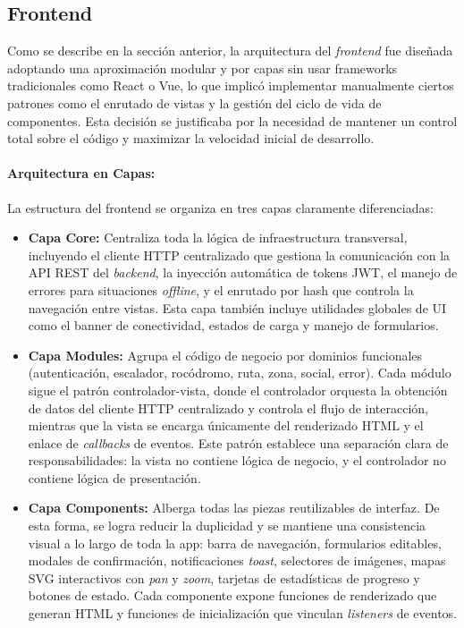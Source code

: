 \subsection{Frontend}

Como se describe en la sección anterior, la arquitectura del \textit{frontend} fue diseñada adoptando una aproximación modular 
y por capas sin usar frameworks tradicionales como React o Vue, lo que implicó implementar manualmente ciertos patrones 
como el enrutado de vistas y la gestión del ciclo de vida de componentes. Esta decisión se justificaba por la necesidad 
de mantener un control total sobre el código y maximizar la velocidad inicial de desarrollo.

\paragraph{Arquitectura en Capas:} La estructura del frontend se organiza en tres capas claramente diferenciadas:

\begin{itemize}
    \item \textbf{Capa Core:} Centraliza toda la lógica de infraestructura transversal, incluyendo el cliente HTTP centralizado que gestiona la comunicación con la API REST del \textit{backend}, la inyección automática de tokens JWT, el manejo de errores para situaciones \textit{offline}, y el enrutado por hash que controla la navegación entre vistas. Esta capa también incluye utilidades globales de UI como el banner de conectividad, estados de carga y manejo de formularios.
    
    \item \textbf{Capa Modules:} Agrupa el código de negocio por dominios funcionales (autenticación, escalador, rocódromo, ruta, zona, social, error). Cada módulo sigue el patrón controlador-vista, donde el controlador orquesta la obtención de datos del cliente HTTP centralizado y controla el flujo de interacción, mientras que la vista se encarga únicamente del renderizado HTML y el enlace de \textit{callbacks} de eventos. Este patrón establece una separación clara de responsabilidades: la vista no contiene lógica de negocio, y el controlador no contiene lógica de presentación.
    
    \item \textbf{Capa Components:} Alberga todas las piezas reutilizables de interfaz. De esta forma, se logra reducir la duplicidad y se mantiene una consistencia visual a lo largo de toda la app: barra de navegación, formularios editables, modales de confirmación, notificaciones \textit{toast}, selectores de imágenes, mapas SVG interactivos con \textit{pan} y \textit{zoom}, tarjetas de estadísticas de progreso y botones de estado. Cada componente expone funciones de renderizado que generan HTML y funciones de inicialización que vinculan \textit{listeners} de eventos.
\end{itemize}

